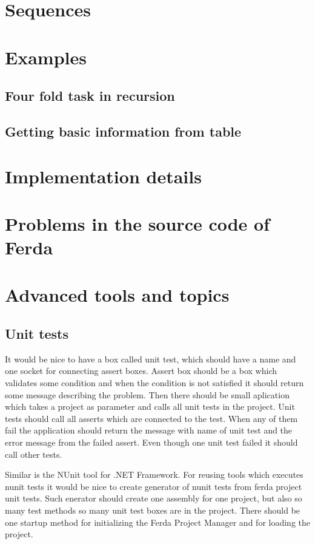 \documentclass{article}
\begin{document}
\section{Sequences}
\section{Examples}
\subsection{Four fold task in recursion}
\subsection{Getting basic information from table}
\section{Implementation details}
\section{Problems in the source code of Ferda}
\section{Advanced tools and topics}
\subsection{Unit tests}
It would be nice to have a box called unit test, which should have a name and one socket for connecting assert boxes. Assert box should be a box which validates some condition and when the condition is not satisfied it should return some message describing the problem. Then there should be small aplication which takes a project as parameter and calls all unit tests in the project. Unit tests should call all asserts which are connected to the test. When any of them fail the application should return the message with name of unit test and the error message from the failed assert. Even though one unit test failed it should call other tests.

Similar is the NUnit tool for .NET Framework. For reusing tools which executes nunit tests it would be nice to create generator of nunit tests from ferda project unit tests. Such enerator should create one assembly for one project, but also so many test methods so many unit test boxes are in the project. There should be one startup method for initializing the Ferda Project Manager and for loading the project. 
\end{document}

